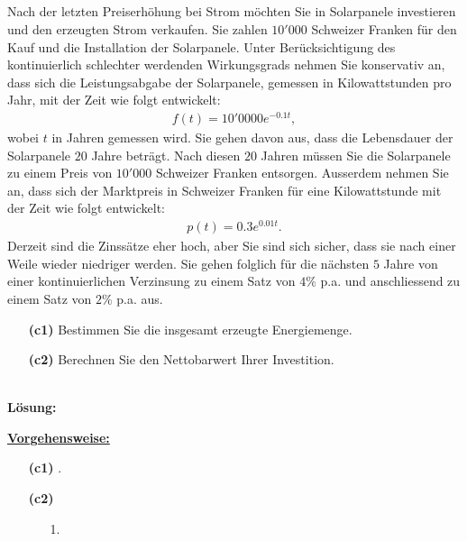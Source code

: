 \newpage
\subsection*{}
Nach der letzten Preiserhöhung bei Strom möchten Sie in Solarpanele investieren und den erzeugten Strom verkaufen. 
Sie zahlen $10'000$ Schweizer Franken für den Kauf und die
Installation der Solarpanele.
Unter Berücksichtigung des kontinuierlich schlechter werdenden Wirkungsgrads nehmen Sie konservativ an, dass sich die Leistungsabgabe der Solarpanele, gemessen in Kilowattstunden pro Jahr, mit der Zeit wie folgt entwickelt:
\begin{align*}
	f(t) = 10'0000 e^{-0.1 t},
\end{align*}
wobei $t$ in Jahren gemessen wird.
Sie gehen davon aus, dass die Lebensdauer der Solarpanele $20$ Jahre beträgt. Nach diesen $20$ Jahren müssen Sie die Solarpanele zu einem Preis von $10'000$ Schweizer Franken entsorgen. Ausserdem nehmen Sie an, dass sich der Marktpreis in
Schweizer Franken für eine Kilowattstunde mit der Zeit wie folgt entwickelt:
\begin{align*}
	p(t)
	=
	0.3 e^{0.01t}.
\end{align*}
Derzeit sind die Zinssätze eher hoch, aber Sie sind sich sicher, dass sie nach einer Weile wieder niedriger werden. Sie gehen folglich für die nächsten $5$ Jahre von einer kontinuierlichen
Verzinsung zu einem Satz von $4 \%$ p.a. und anschliessend zu einem Satz von $2\%$ p.a. aus.

\begin{enumerate}
	\item[\textbf{(c1)}] 
	Bestimmen Sie die insgesamt erzeugte Energiemenge.
	\item[\textbf{(c2)}]
	Berechnen Sie den Nettobarwert Ihrer Investition.
\end{enumerate}
\ \\
\textbf{Lösung:}
\begin{mdframed}
\underline{\textbf{Vorgehensweise:}}
\begin{enumerate}
\item[\textbf{(c1)}] .
\item[\textbf{(c2)}]
\begin{enumerate}
	\item[1.] 
\end{enumerate}
\end{enumerate}
\end{mdframed}




\newpage

